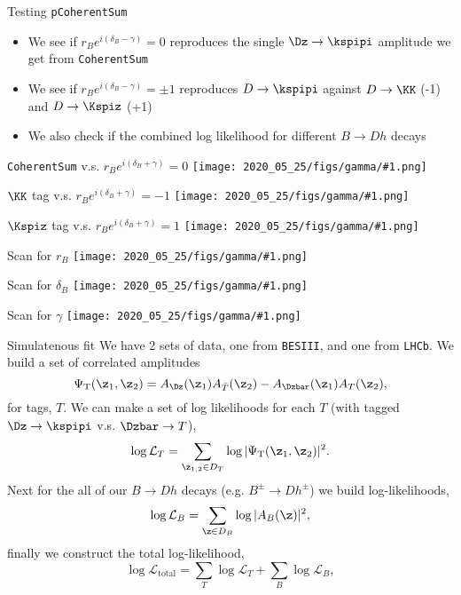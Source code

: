 \begin{frame}{Testing \texttt{pCoherentSum}}
	\begin{itemize}
		\item We see if $r_B e^{i (\delta_B - \gamma)} =0$ reproduces the single $\Dz \to \kspipi$ amplitude we get from \texttt{CoherentSum}
		\item We see if $r_B e^{i (\delta_B - \gamma)} =\pm1$ reproduces $D \to \kspipi$ against $D \to \KK$ (-1) and $D \to \Kspiz$ (+1)
		\item We also check if the combined log likelihood for different $B \to D h$ decays
	\end{itemize}
\end{frame}

\newcommand{\comparetf}[2]{
	\begin{frame}{#2}
		\texttt{[image: 2020\_05\_25/figs/gamma/\#1.png]}
	\end{frame}
}


\comparetf{uncorrVStest0}{\texttt{CoherentSum} v.s. $r_B e^{i(\delta_B + \gamma)} = 0$}
\comparetf{KKVStestKK}{$\KK$ tag v.s. $r_B e^{i(\delta_B + \gamma)} = -1$}
\comparetf{Kspi0VStestKspi0}{$\Kspiz$ tag v.s. $r_B e^{i(\delta_B + \gamma)} = 1$}
\comparetf{rB_Norm}{Scan for $r_B$}
\comparetf{dB_Norm}{Scan for $\delta_B$}
\comparetf{gamma_Norm}{Scan for $\gamma$}

   \begin{frame}{Simulatenous fit}
           We have 2 sets of data, one from \texttt{BESIII}, and one from \texttt{LHCb}. We build a set of correlated amplitudes
           \begin{equation}
                   \Psi_\text{T}(\z_1, \z_2) = A_{\Dz}(\z_1) A_{\bar{T}}(\z_2) - A_{\Dzbar}(\z_1) A_{T}(\z_2),
           \end{equation}
            for tags, $T$. We can make a set of log likelihoods for each $T$ (with tagged $\Dz \to \kspipi$ v.s. $\Dzbar \to T$),
            \begin{equation}
                    \log \mathcal{L}_{T} = \sum_{\z_{1,2} \in D_T} \log |\Psi_\text{T}(\z_1,\z_2)|^2.
            \end{equation}
            Next for the all of our $B \to Dh$ decays (e.g. $B^\pm \to D h^\pm$) we build log-likelihoods,
            \begin{equation}
                    \log \mathcal{L}_{B} = \sum_{\z \in D_B} \log |A_B(\z)|^2,
            \end{equation}
            finally we construct the total log-likelihood, 
            \begin{equation}
                    \log \mathcal{L}_\text{total} = \sum_T \log \mathcal{L}_{T} + \sum_B \log \mathcal{L}_{B},
            \end{equation}

   \end{frame}



